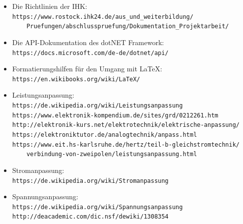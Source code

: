 \documentclass[a4paper]{article}
\begin{document}
\begin{itemize}
    \item Die Richtlinien der IHK:\\
    \verb|https://www.rostock.ihk24.de/aus_und_weiterbildung/|\\
    \verb|    Pruefungen/abschlusspruefung/Dokumentation_Projektarbeit/|
    
    \item Die API-Dokumentation des \glqq dotNET Framework\grqq{}:\\
    \verb|https://docs.microsoft.com/de-de/dotnet/api/|\\
    
    \item Formatierungshilfen für den Umgang mit \LaTeX:\\
    \verb|https://en.wikibooks.org/wiki/LaTeX/|\\
    
    \item Leistungsanpassung:\\
    \verb|https://de.wikipedia.org/wiki/Leistungsanpassung|\\
    \verb|https://www.elektronik-kompendium.de/sites/grd/0212261.htm|\\
    \verb|http://elektronik-kurs.net/elektrotechnik/elektrische-anpassung/|\\
    \verb|https://elektroniktutor.de/analogtechnik/anpass.html|\\
    \verb|https://www.eit.hs-karlsruhe.de/hertz/teil-b-gleichstromtechnik/|\\
    \verb|    verbindung-von-zweipolen/leistungsanpassung.html|\\
    
    \item Stromanpassung:\\
    \verb|https://de.wikipedia.org/wiki/Stromanpassung|\\
    
    \item Spannungsanpassung:\\
    \verb|https://de.wikipedia.org/wiki/Spannungsanpassung|\\
    \verb|http://deacademic.com/dic.nsf/dewiki/1308354|\\
    
\end{itemize}

\end{document}
